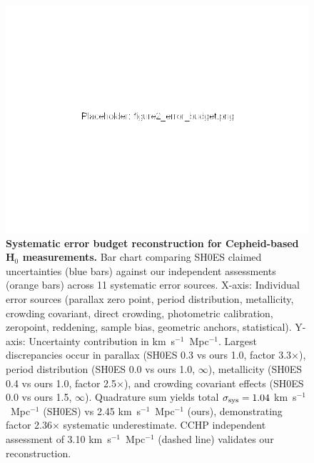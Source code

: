 \documentclass[twocolumn, linenumbers]{aastex701}
\begin{document}
\begin{figure}
\includegraphics[width=\columnwidth]{../figures/figure2_error_budget.png}
\caption{\textbf{Systematic error budget reconstruction for Cepheid-based H$_0$ measurements.} Bar chart comparing SH0ES claimed uncertainties (blue bars) against our independent assessments (orange bars) across 11 systematic error sources. X-axis: Individual error sources (parallax zero point, period distribution, metallicity, crowding covariant, direct crowding, photometric calibration, zeropoint, reddening, sample bias, geometric anchors, statistical). Y-axis: Uncertainty contribution in km~s$^{-1}$~Mpc$^{-1}$. Largest discrepancies occur in parallax (SH0ES 0.3 vs ours 1.0, factor 3.3$\times$), period distribution (SH0ES 0.0 vs ours 1.0, $\infty$), metallicity (SH0ES 0.4 vs ours 1.0, factor 2.5$\times$), and crowding covariant effects (SH0ES 0.0 vs ours 1.5, $\infty$). Quadrature sum yields total $\sigma_{\rm sys} = 1.04$ km~s$^{-1}$~Mpc$^{-1}$ (SH0ES) vs 2.45 km~s$^{-1}$~Mpc$^{-1}$ (ours), demonstrating factor 2.36$\times$ systematic underestimate. CCHP independent assessment of 3.10 km~s$^{-1}$~Mpc$^{-1}$ (dashed line) validates our reconstruction.}
\label{fig:error_budget}
\end{figure}
\end{document}
